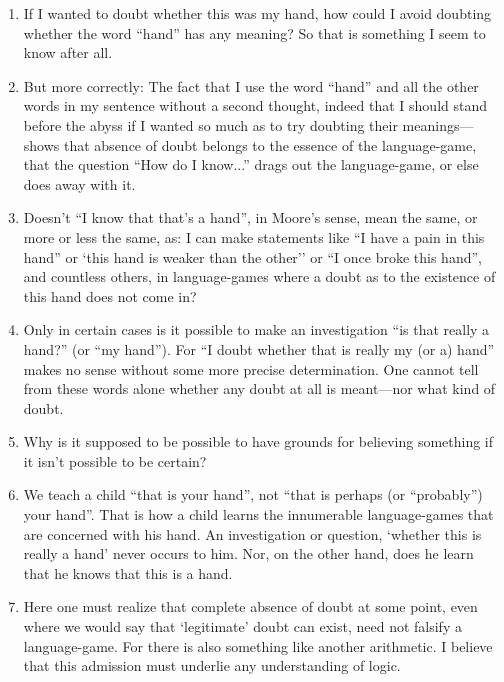 \documentclass{book}
\begin{document}
\begin{enumerate}
\item
If I wanted to doubt whether this was my hand, how could I avoid doubting
whether the word ``hand'' has any meaning? So that is something I seem to know
after all.

\item
But more correctly: The fact that I use the word ``hand'' and all the other
words in my sentence without a second thought, indeed that I should stand
before the abyss if I wanted so much as to try doubting their meanings---shows
that absence of doubt belongs to the essence of the language-game, that the
question ``How do I know...'' drags out the language-game, or else does away
with it.

\item
Doesn't ``I know that that's a hand'', in Moore's sense, mean the same, or more
or less the same, as: I can make statements like ``I have a pain in this hand''
or `this hand is weaker than the other'' or ``I once broke this hand'', and
countless others, in language-games where a doubt as to the existence of this
hand does not come in?

\item
Only in certain cases is it possible to make an investigation ``is that really
a hand?'' (or ``my hand''). For ``I doubt whether that is really my (or a)
hand'' makes no sense without some more precise determination. One cannot tell
from these words alone whether any doubt at all is meant---nor what kind of
doubt.

\item
Why is it supposed to be possible to have grounds for believing something if it
isn't possible to be certain?

\item
We teach a child ``that is your hand'', not ``that is perhaps (or ``probably'')
your hand''. That is how a child learns the innumerable language-games that are
concerned with his hand. An investigation or question, `whether this is really
a hand' never occurs to him. Nor, on the other hand, does he learn that he
knows that this is a hand.

\item
Here one must realize that complete absence of doubt at some point, even where
we would say that `legitimate' doubt can exist, need not falsify a
language-game. For there is also something like another arithmetic.  I believe
that this admission must underlie any understanding of logic.


\end{enumerate}
\end{document}
